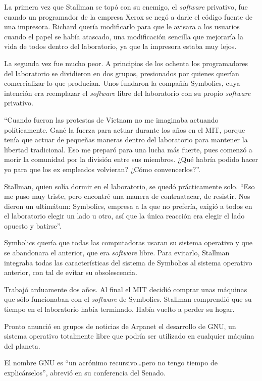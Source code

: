 \documentclass[oneside,twocolumn]{article}
\begin{document}
La primera vez que Stallman se topó con su enemigo, el \emph{software} privativo, fue cuando 
un programador de la empresa Xerox se negó a darle el código fuente de una impresora. Richard quería 
modificarlo para que le avisara a los usuarios cuando el papel se había atascado, una modificación 
sencilla que mejoraría la vida de todos dentro del laboratorio, ya que la impresora estaba muy lejos.

La segunda vez fue mucho peor. A principios de los ochenta los programadores del laboratorio se 
dividieron en dos grupos, presionados por quienes querían comercializar lo que producían. Unos fundaron 
la compañía Symbolics, cuya intención era reemplazar el \emph{software} libre del laboratorio con 
su propio \emph{software} privativo.

``Cuando fueron las protestas de Vietnam no me imaginaba actuando políticamente. Gané la fuerza 
para actuar durante los años en el MIT, porque tenía que actuar de pequeñas maneras dentro del 
laboratorio para mantener la libertad tradicional. Eso me preparó para una lucha más fuerte, pues 
comenzó a morir la comunidad por la división entre sus miembros. ¿Qué habría podido hacer yo para 
que los ex empleados volvieran? ¿Cómo convencerlos?''.

Stallman, quien solía dormir en el laboratorio, se quedó prácticamente solo. ``Eso me puso muy 
triste, pero encontré una manera de contraatacar, de resistir. Nos dieron un ultimátum: Symbolics, 
empresa a la que no prefería, exigió a todos en el laboratorio elegir un lado u otro, así que la 
única reacción era elegir el lado opuesto y batirse''.

Symbolics quería que todas las computadoras usaran su sistema operativo y que se abandonara el 
anterior, que era \emph{software} libre. Para evitarlo, Stallman integraba todas las características 
del sistema de Symbolics al sistema operativo anterior, con tal de evitar su obsolescencia.

Trabajó arduamente dos años. Al final el MIT decidió comprar unas máquinas que sólo funcionaban 
con el \emph{software} de Symbolics. Stallman comprendió que su tiempo en el laboratorio había terminado. 
Había vuelto a perder su hogar.

Pronto anunció en grupos de noticias de Arpanet el desarrollo de GNU, un sistema operativo totalmente 
libre que podría ser utilizado en cualquier máquina del planeta.

El nombre GNU es ``un acrónimo recursivo\ldots pero no tengo tiempo de explicárselos'', abrevió en su 
conferencia del Senado.
\end{document}
